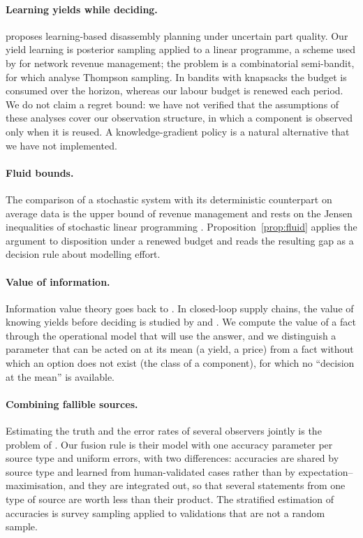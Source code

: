 \paragraph{Learning yields while deciding.} \citet{reveliotis2007} proposes learning-based disassembly planning
under uncertain part quality. Our yield learning is posterior sampling \citep{thompson1933,russo2014} applied to a
linear programme, a scheme used by \citet{ferreira2018} for network revenue management; the problem is a
combinatorial semi-bandit, for which \citet{wang2018} analyse Thompson sampling. In bandits with knapsacks
\citep{badanidiyuru2018bandits} the budget is consumed over the horizon, whereas our labour budget is renewed each period.
We do not claim a regret bound: we have not verified that the assumptions of these analyses cover our observation
structure, in which a component is observed only when it is reused. A knowledge-gradient policy
\citep{frazier2008} is a natural alternative that we have not implemented.

\paragraph{Fluid bounds.} The comparison of a stochastic system with its deterministic counterpart on average data
is the upper bound of revenue management \citep{gallego1994} and rests on the Jensen inequalities of stochastic
linear programming \citep{madansky1960}. Proposition~\ref{prop:fluid} applies the argument to disposition under a
renewed budget and reads the resulting gap as a decision rule about modelling effort.

\paragraph{Value of information.} Information value theory goes back to \citet{howard1966}. In closed-loop supply
chains, the value of knowing yields before deciding is studied by \citet{ferrer2004} and \citet{ketzenberg2006}.
We compute the value of a fact through the operational model that will use the answer, and we distinguish a
parameter that can be acted on at its mean (a yield, a price) from a fact without which an option does not exist
(the class of a component), for which no ``decision at the mean'' is available.

\paragraph{Combining fallible sources.} Estimating the truth and the error rates of several observers jointly is
the problem of \citet{dawid1979}. Our fusion rule is their model with one accuracy parameter per source type and
uniform errors, with two differences: accuracies are shared by source type and learned from human-validated cases
rather than by expectation--maximisation, and they are integrated out, so that several statements from one type of
source are worth less than their product. The stratified estimation of accuracies is survey sampling
\citep{horvitz1952} applied to validations that are not a random sample.

